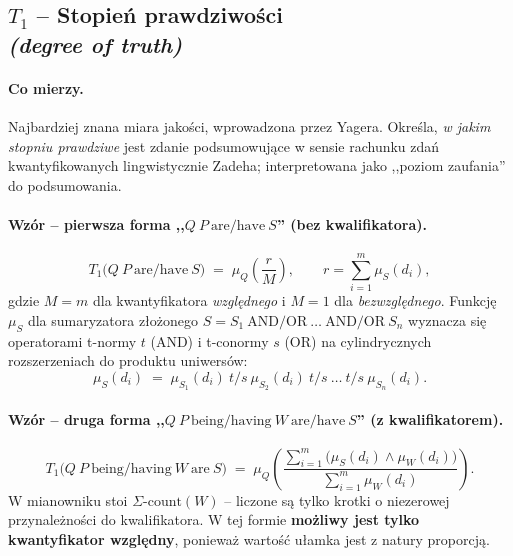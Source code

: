\subsection*{$T_1$ -- Stopień prawdziwości \\
\textit{(degree of truth)}}

\paragraph{Co mierzy.}
Najbardziej znana miara jakości, wprowadzona przez Yagera. Określa,
\emph{w jakim stopniu prawdziwe} jest zdanie podsumowujące w sensie
rachunku zdań kwantyfikowanych lingwistycznie Zadeha; interpretowana
jako ,,poziom zaufania'' do podsumowania.

\paragraph{Wzór -- pierwsza forma ,,$Q\ P\ \text{are/have}\ S$''
(bez kwalifikatora).}
\begin{equation}
\label{eq:T1-form1}
    T_1\bigl(Q\ P\ \text{are/have}\ S\bigr)
    \;=\;
    \mu_Q\!\left( \frac{r}{M} \right),
    \qquad
    r = \sum_{i=1}^{m} \mu_S(d_i),
\end{equation}
gdzie $M = m$ dla kwantyfikatora \emph{względnego} i $M = 1$ dla
\emph{bezwzględnego}. Funkcję $\mu_S$ dla sumaryzatora złożonego
$S = S_1\ \text{AND/OR}\ \ldots\ \text{AND/OR}\ S_n$ wyznacza się
operatorami t-normy $t$ (AND) i t-conormy $s$ (OR) na cylindrycznych
rozszerzeniach do produktu uniwersów:
\begin{equation}
\label{eq:T1-mu-compound}
    \mu_S(d_i) \;=\; \mu_{S_1}(d_i)\ t/s\ \mu_{S_2}(d_i)\ t/s\ \ldots\ t/s\ \mu_{S_n}(d_i).
\end{equation}

\paragraph{Wzór -- druga forma ,,$Q\ P\ \text{being/having}\ W\ \text{are/have}\ S$''
(z kwalifikatorem).}
\begin{equation}
\label{eq:T1-form2}
    T_1\bigl(Q\ P\ \text{being/having}\ W\ \text{are}\ S\bigr)
    \;=\;
    \mu_Q\!\left(
        \frac{\sum_{i=1}^{m}\bigl(\mu_S(d_i) \wedge \mu_W(d_i)\bigr)}
             {\sum_{i=1}^{m}\mu_W(d_i)}
    \right).
\end{equation}
W mianowniku stoi $\Sigma\text{-count}(W)$ -- liczone są tylko krotki
o niezerowej przynależności do kwalifikatora. W tej formie
\textbf{możliwy jest tylko kwantyfikator względny}, ponieważ wartość
ułamka jest z natury proporcją.

